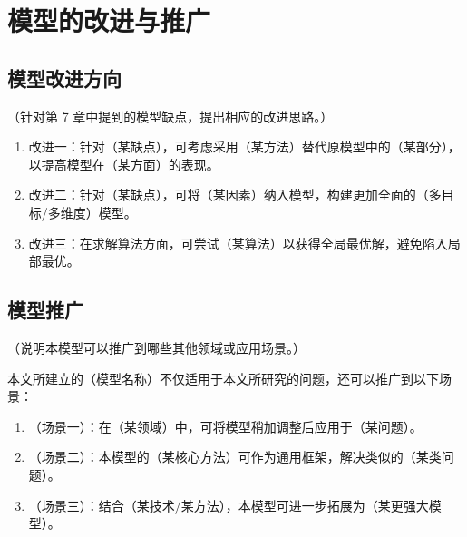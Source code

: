\section{模型的改进与推广}

\subsection{模型改进方向}

（针对第 7 章中提到的模型缺点，提出相应的改进思路。）

\begin{enumerate}
    \item {\heiti 改进一：}针对（某缺点），可考虑采用（某方法）替代原模型中的（某部分），以提高模型在（某方面）的表现。
    \item {\heiti 改进二：}针对（某缺点），可将（某因素）纳入模型，构建更加全面的（多目标/多维度）模型。
    \item {\heiti 改进三：}在求解算法方面，可尝试（某算法）以获得全局最优解，避免陷入局部最优。
\end{enumerate}

\subsection{模型推广}

（说明本模型可以推广到哪些其他领域或应用场景。）

本文所建立的（模型名称）不仅适用于本文所研究的问题，还可以推广到以下场景：

\begin{enumerate}
    \item （场景一）：在（某领域）中，可将模型稍加调整后应用于（某问题）。
    \item （场景二）：本模型的（某核心方法）可作为通用框架，解决类似的（某类问题）。
    \item （场景三）：结合（某技术/某方法），本模型可进一步拓展为（某更强大模型）。
\end{enumerate}
